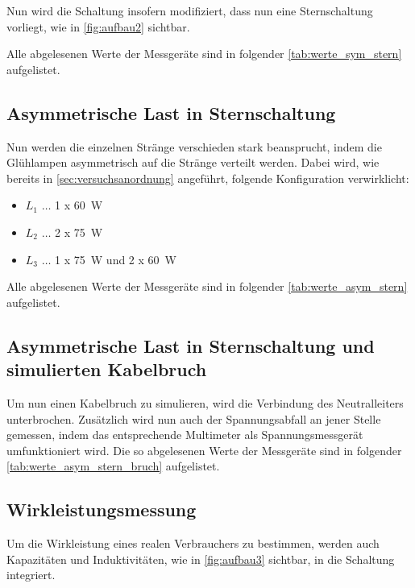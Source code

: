 \documentclass[12pt,english,ngerman]{scrartcl}
\begin{document}
Nun wird die Schaltung insofern modifiziert, dass nun eine Sternschaltung vorliegt, wie in \autoref{fig:aufbau2} sichtbar.

Alle abgelesenen Werte der Messgeräte sind in folgender \autoref{tab:werte_sym_stern} aufgelistet.


\subsection{Asymmetrische Last in Sternschaltung}

Nun werden die einzelnen Stränge verschieden stark beansprucht, indem die Glühlampen asymmetrisch auf die Stränge 
verteilt werden. Dabei wird, wie bereits in \autoref{sec:versuchsanordnung} angeführt, folgende Konfiguration verwirklicht:

\begin{itemize}
	\item $L_1$ \(\dots\) 1 x \SI[]{60}{\watt} \\
	\item $L_2$ \(\dots\) 2 x \SI[]{75}{\watt} \\
	\item $L_3$ \(\dots\) 1 x \SI[]{75}{\watt} und 2 x \SI[]{60}{\watt}
\end{itemize}

Alle abgelesenen Werte der Messgeräte sind in folgender \autoref{tab:werte_asym_stern} aufgelistet.



\subsection{Asymmetrische Last in Sternschaltung und simulierten Kabelbruch}

Um nun einen Kabelbruch zu simulieren, wird die Verbindung des Neutralleiters unterbrochen. Zusätzlich wird nun auch der 
Spannungsabfall an jener Stelle gemessen, indem das entsprechende Multimeter als Spannungsmessgerät umfunktioniert  wird.
Die so abgelesenen Werte der Messgeräte sind in folgender \autoref{tab:werte_asym_stern_bruch} aufgelistet.


\subsection{Wirkleistungsmessung}
Um die Wirkleistung eines realen Verbrauchers zu bestimmen, werden auch Kapazitäten und Induktivitäten, wie in \autoref{fig:aufbau3}
sichtbar, in die Schaltung integriert.
\end{document}
